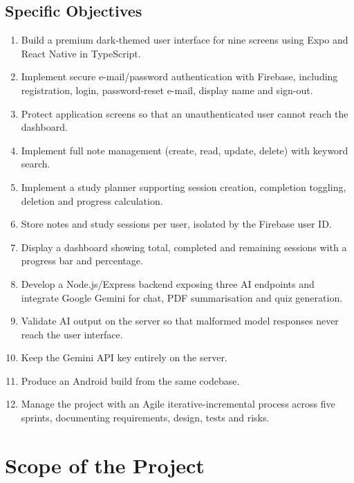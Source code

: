 \documentclass[12pt,a4paper,oneside]{report}
\begin{document}
\subsection{Specific Objectives}
\begin{enumerate}[label=\textbf{SO-\arabic*.}, leftmargin=*, itemsep=2pt]
  \item Build a premium dark-themed user interface for nine screens using Expo and
        React Native in TypeScript.
  \item Implement secure e-mail/password authentication with Firebase, including
        registration, login, password-reset e-mail, display name and sign-out.
  \item Protect application screens so that an unauthenticated user cannot reach the
        dashboard.
  \item Implement full note management (create, read, update, delete) with keyword
        search.
  \item Implement a study planner supporting session creation, completion toggling,
        deletion and progress calculation.
  \item Store notes and study sessions per user, isolated by the Firebase user ID.
  \item Display a dashboard showing total, completed and remaining sessions with a
        progress bar and percentage.
  \item Develop a Node.js/Express backend exposing three AI endpoints and integrate
        Google Gemini for chat, PDF summarisation and quiz generation.
  \item Validate AI output on the server so that malformed model responses never
        reach the user interface.
  \item Keep the Gemini API key entirely on the server.
  \item Produce an Android build from the same codebase.
  \item Manage the project with an Agile iterative-incremental process across five
        sprints, documenting requirements, design, tests and risks.
\end{enumerate}

\section{Scope of the Project}
\end{document}
